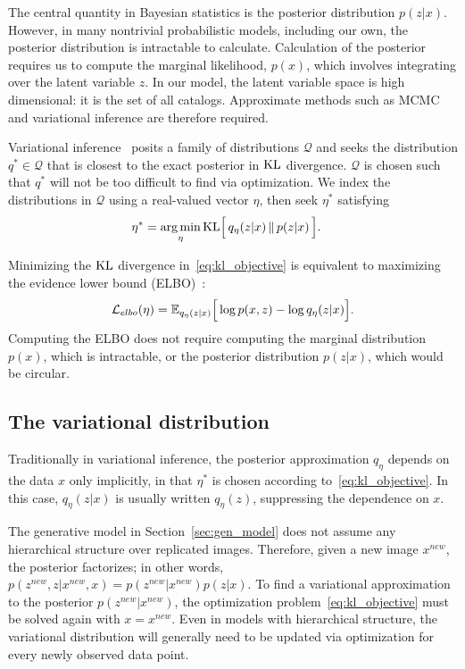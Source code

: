 The central quantity in Bayesian statistics is the posterior distribution $p(z|x)$.
However, in many
nontrivial probabilistic models, including our own, the posterior distribution is intractable to calculate.
Calculation of the posterior requires us to compute the marginal likelihood, $p(x)$, which involves integrating over the latent variable $z$. 
In our model, the latent variable space is high dimensional: it is the set of all catalogs. Approximate methods such as MCMC and variational inference are therefore required. 

Variational inference~\cite{Blei_2017_vi_review, Jordan_intro_vi, Wainwrite_graph_models_vi} posits a family of distributions $\mathcal{Q}$ and seeks
the distribution $q^*\in \mathcal{Q}$ that is closest to the exact posterior
in $\textrm{KL}$ divergence. 
$\mathcal{Q}$ is chosen such that $q^*$ will not be too difficult to find via optimization. 
We index the distributions in $\mathcal{Q}$ using a real-valued vector $\eta$, then seek $\eta^*$ satisfying
\begin{align}
   \eta^* &= \operatorname*{arg\,min}_{\eta} \mathrm{KL}\Big[\,q_\eta(z | x)\, \| \,p(z | x)\,\Big].
   \label{eq:kl_objective}
\end{align}

Minimizing the $\textrm{KL}$ divergence in~\eqref{eq:kl_objective} is equivalent to maximizing the evidence lower bound (ELBO)~\cite{Blei_2017_vi_review}:
\begin{align}
    \mathcal{L}_{elbo}(\eta) = 
    \mathbb{E}_{q_\eta(z | x)}\Big[\log p(x, z) - \log q_\eta(z | x)\Big].
    \label{eq:elbo}
\end{align}
Computing the ELBO does not require computing the marginal distribution $p(x)$, which is intractable, or the posterior distribution $p(z | x)$, which would be circular. 

\subsection{The variational distribution}
\label{sec:var_distr}
Traditionally in variational inference, the posterior approximation $q_\eta$ depends on the data $x$ only implicitly, 
in that $\eta^*$ is chosen according to~\eqref{eq:kl_objective}.
In this case, $q_\eta(z | x)$ is usually written $q_\eta(z)$, suppressing the dependence on $x$.

The generative model in Section~\ref{sec:gen_model} does not assume any hierarchical structure over replicated  images. Therefore, given a new image $x^{new}$, the posterior factorizes; in other words,
$p(z^{new}, z | x^{new}, x) = p(z^{new} | x^{new}) p(z | x)$. 
To find a variational  approximation to the posterior $p(z^{new} | x^{new})$, the optimization problem~\eqref{eq:kl_objective} must be solved again with $x = x^{new}$.
Even in models with hierarchical structure, the variational distribution will generally need to be updated via optimization for every newly observed data point. 

